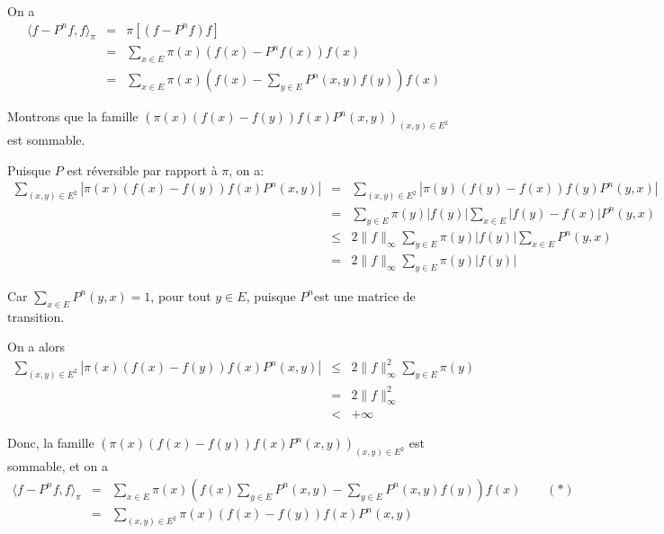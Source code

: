 {\hspace{3em}}

On a
\begin{eqnarray*}
  \langle f - P^n f, f \rangle_{\pi} & = & \pi [(f - P^n f) f]\\
  & = & \underset{x \in E}{\sum} \pi (x) (f (x) - P^n f (x)) f (x)\\
  & = & \underset{x \in E}{\sum} \pi (x) \left( f (x) - \underset{y \in
  E}{\sum} P^n (x, y) f (y) \right) f (x)
\end{eqnarray*}


Montrons que la famille ${(\pi (x) (f (x) - f (y)) f (x) P^n (x, y))_{(x, y)
\in E^2}} $ est sommable.

Puisque $P$ est r{\'e}versible par rapport {\`a} $\pi$, on a:
\begin{eqnarray*}
  \underset{(x, y) \in E^2}{\sum} | \pi (x) (f (x) - f (y)) f (x) P^n (x, y) |
  & = & \underset{(x, y) \in E^2}{\sum} | \pi (y) (f (y) - f (x)) f (y) P^n
  (y, x) |\\
  & = & \underset{y \in E}{\sum} \pi (y) | f (y) | \underset{x \in E}{\sum} |
  f (y) - f (x) | P^n (y, x)\\
  & \leqslant & 2 \| f \|_{\infty} \underset{y \in E}{\sum} \pi (y) | f (y) |
  \underset{x \in E}{\sum} P^n (y, x)\\
  & = & 2 \| f \|_{\infty} \underset{y \in E}{\sum} \pi (y) | f (y) |
\end{eqnarray*}


Car $\underset{x \in E}{\sum} P^n (y, x) = 1$, pour tout $y \in E$, puisque
$P^n $est une matrice de transition.

On a alors
\begin{eqnarray*}
  \underset{(x, y) \in E^2}{\sum} | \pi (x) (f (x) - f (y)) f (x) P^n (x, y) |
  & \leqslant & 2 \| f \|^2_{\infty} \underset{y \in E}{\sum} \pi (y)\\
  & = & 2 \| f \|^2_{\infty}\\
  & < & + \infty
\end{eqnarray*}


Donc, la famille ${(\pi (x) (f (x) - f (y)) f (x) P^n (x, y))_{(x, y) \in
E^2}} $ est sommable, et on a
\begin{eqnarray*}
  \langle f - P^n f, f \rangle_{\pi} & = & \underset{x \in E }{\sum} \pi (x)
  \left( f (x) \underset{y \in E}{\sum} P^n (x, y) - \underset{y \in E}{\sum}
  P^n (x, y) f (y) \right) f (x) \qquad (\ast)\\
  & = & \underset{(x, y) \in E^2}{\sum} \pi (x) (f (x) - f (y)) f (x) P^n (x,
  y)
\end{eqnarray*}


